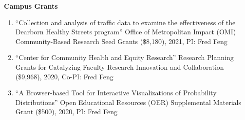\documentclass[11pt]{article}
\newenvironment{main}
{\begin{adjustwidth}{3em}{}}
{\end{adjustwidth}}
\begin{document}
\begin{main}
\textbf{Campus Grants}
\begin{enumerate}
    \item ``Collection and analysis of traffic data to examine the effectiveness of the Dearborn Healthy Streets program''
          Office of Metropolitan Impact (OMI) Community-Based Research Seed Grants (\$8,180), 2021, PI: Fred Feng
    \item ``Center for Community Health and Equity Research'' 
         Research Planning Grants for Catalyzing Faculty Research Innovation and Collaboration (\$9,968), 2020, Co-PI: Fred Feng
    \item ``A Browser-based Tool for Interactive Visualizations of Probability Distributions''
        Open Educational Resources (OER) Supplemental Materials Grant (\$500), 2020, PI: Fred Feng

\end{enumerate}






\end{main}
\end{document}
